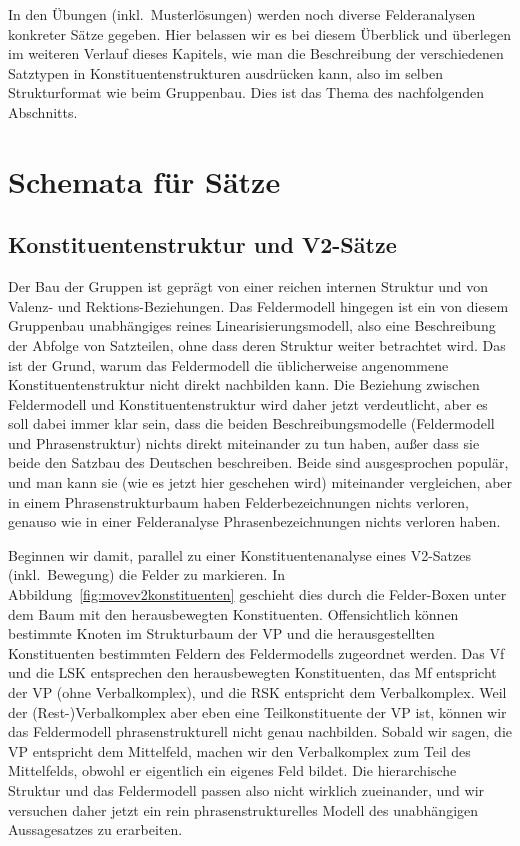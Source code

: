 In den Übungen (inkl.\ Musterlösungen) werden noch diverse Felderanalysen konkreter Sätze gegeben.
Hier belassen wir es bei diesem Überblick und überlegen im weiteren Verlauf dieses Kapitels, wie man die Beschreibung der verschiedenen Satztypen in Konstituentenstrukturen ausdrücken kann, also im selben Strukturformat wie beim Gruppenbau.
Dies ist das Thema des nachfolgenden Abschnitts.

\section{Schemata für Sätze}

\label{sec:satzschemata}
\label{sec:verbzweitsatz}

\subsection{Konstituentenstruktur und V2-Sätze}

\label{sec:konstituentenstrukturinv2}

Der Bau der Gruppen ist geprägt von einer reichen internen Struktur und von Valenz- und Rektions-Beziehungen.
Das Feldermodell hingegen ist ein von diesem Gruppenbau unabhängiges reines Linearisierungsmodell, also eine Beschreibung der Abfolge von Satzteilen, ohne dass deren Struktur weiter betrachtet wird.
Das ist der Grund, warum das Feldermodell die üblicherweise angenommene Konstituentenstruktur nicht direkt nachbilden kann.
Die Beziehung zwischen Feldermodell und Konstituentenstruktur wird daher jetzt verdeutlicht, aber es soll dabei immer klar sein, dass die beiden Beschreibungsmodelle (Feldermodell und Phrasenstruktur) nichts direkt miteinander zu tun haben, außer dass sie beide den Satzbau des Deutschen beschreiben.
Beide sind ausgesprochen populär, und man kann sie (wie es jetzt hier geschehen wird) miteinander vergleichen, aber in einem Phrasenstrukturbaum haben Felderbezeichnungen nichts verloren, genauso wie in einer Felderanalyse Phrasenbezeichnungen nichts verloren haben.

Beginnen wir damit, parallel zu einer Konstituentenanalyse eines V2-Satzes (inkl.\ Bewegung) die Felder zu markieren.
In Abbildung~\ref{fig:movev2konstituenten} geschieht dies durch die Felder-Boxen unter dem Baum mit den herausbewegten Konstituenten.
Offensichtlich können bestimmte Knoten im Strukturbaum der VP und die herausgestellten Konstituenten bestimmten Feldern des Feldermodells zugeordnet werden.
Das Vf und die LSK entsprechen den herausbewegten Konstituenten, das Mf entspricht der VP (ohne Verbalkomplex), und die RSK entspricht dem Verbalkomplex.
Weil der (Rest-)Verbalkomplex aber eben eine Teilkonstituente der VP ist, können wir das Feldermodell phrasenstrukturell nicht genau nachbilden.
Sobald wir sagen, die VP entspricht dem Mittelfeld, machen wir den Verbalkomplex zum Teil des Mittelfelds, obwohl er eigentlich ein eigenes Feld bildet.
Die hierarchische Struktur und das Feldermodell passen also nicht wirklich zueinander, und wir versuchen daher jetzt ein rein phrasenstrukturelles Modell des unabhängigen Aussagesatzes zu erarbeiten.


